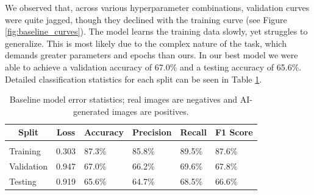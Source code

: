 \documentclass{article} %
\begin{document}
We observed that, across various hyperparameter combinations, validation curves were quite jagged, though they declined with the training curve (see Figure \ref{fig:baseline_curves}). The model learns the training data slowly, yet struggles to generalize. This is most likely due to the complex nature of the task, which demands greater parameters and epochs than ours. In our best model we were able to achieve a validation accuracy of 67.0\% and a testing accuracy of 65.6\%. Detailed classification statistics for each split can be seen in Table \ref{baseline_stats}.

\begin{table}[t]
    \caption{Baseline model error statistics; real images are negatives and AI-generated images are positives.}
    \label{baseline_stats}
    \begin{center}
        \begin{tabular}{llllll}
            \multicolumn{1}{c}{\bf Split} & \multicolumn{1}{c}{\bf Loss} & \multicolumn{1}{c}{\bf Accuracy} & \multicolumn{1}{c}{\bf Precision} & \multicolumn{1}{c}{\bf Recall} & \multicolumn{1}{c}{\bf F1 Score}
            \\ \hline \\
            Training                      & 0.303                        & 87.3\%                           & 85.8\%                            & 89.5\%                         & 87.6\%                           \\
            Validation                    & 0.947                        & 67.0\%                           & 66.2\%                            & 69.6\%                         & 67.8\%                           \\
            Testing                       & 0.919                        & 65.6\%                           & 64.7\%                            & 68.5\%                         & 66.6\%                           \\
        \end{tabular}
    \end{center}
\end{table}
\end{document}
